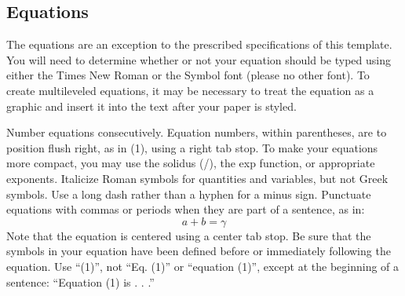 \documentclass[a4paper,conference]{IEEEtran}
\begin{document}
\subsection{Equations}
The equations are an exception to the prescribed specifications of this template. You will need to determine whether or not your equation should be typed using either the Times New Roman or the Symbol font (please no other font). To create multileveled equations, it may be necessary to treat the equation as a graphic and insert it into the text after your paper is styled.

Number equations consecutively. Equation numbers, within parentheses, are to position flush right, as in (1), using a right tab stop. To make your equations more compact, you may use the solidus (/), the exp function, or appropriate exponents. Italicize Roman symbols for quantities and variables, but not Greek symbols. Use a long dash rather than a hyphen for a minus sign. Punctuate equations with commas or periods when they are part of a sentence, as in:
\begin{equation}
    a + b = \gamma
\end{equation}
Note that the equation is centered using a center tab stop. Be sure that the symbols in your equation have been defined before or immediately following the equation. Use “(1)”, not “Eq. (1)” or “equation (1)”, except at the beginning of a sentence: “Equation (1) is . . .”
\end{document}
